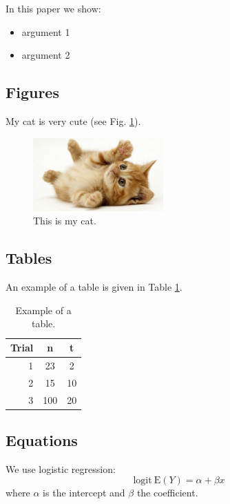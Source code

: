 \documentclass{article}
\begin{document}
	In this paper we show:
	\begin{itemize}
		\item argument 1
		\item argument 2
	\end{itemize}
	
	\subsection{Figures}
	
	My cat is very cute (see Fig. \ref{refcat}).
	
	\begin{figure}[h]
		\centering
		\includegraphics[width=5cm]{cat.jpg}
		\caption{This is my cat.}
		\label{refcat}
	\end{figure}
		
	\subsection{Tables}
	
	An example of a table is given in Table \ref{reftable}.
	
	\begin{table}[h]
		\label{reftable}
		\centering
		\caption{Example of a table.}
		\begin{tabular}{r|c|c} 
			Trial & n & t \\ \hline
			1 & 23 & 2 \\ \hline
			2 & 15 & 10 \\ \hline
			3 & 100 & 20 \\ 
		\end{tabular}
	\end{table}
	
		
	\subsection{Equations}
	
	We use logistic regression:
	\begin{equation}
		 \text{logit} \ \text{E}(Y) = \alpha+\beta x
	\end{equation}
	where $\alpha$ is the intercept and $\beta$ the coefficient.
	
\end{document}
